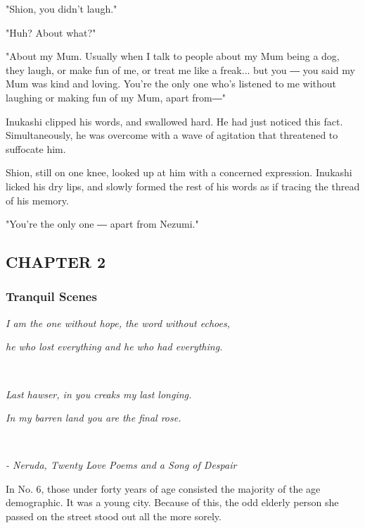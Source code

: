 "Shion, you didn't laugh."

"Huh? About what?"

"About my Mum. Usually when I talk to people about my Mum being a dog,
they laugh, or make fun of me, or treat me like a freak... but you ― you
said my Mum was kind and loving. You're the only one who's listened to
me without laughing or making fun of my Mum, apart from―"

Inukashi clipped his words, and swallowed hard. He had just noticed this
fact. Simultaneously, he was overcome with a wave of agitation that
threatened to suffocate him.

Shion, still on one knee, looked up at him with a concerned expression.
Inukashi licked his dry lips, and slowly formed the rest of his words as
if tracing the thread of his memory.

"You're the only one ― apart from Nezumi."

\hypertarget{index_split_001_split_000.htmlux5cux23calibre_pb_34}{}

\protect\hypertarget{index_split_034.html}{}{}

\hypertarget{index_split_034.htmlux5cux23calibre_pb_0}{}

\hypertarget{index_split_034.htmlux5cux23calibre_toc_3}{%
\subsection{CHAPTER 2}\label{index_split_034.htmlux5cux23calibre_toc_3}}

\subsubsection{Tranquil Scenes}

\emph{I am the one without hope, the word without echoes,}

\emph{he who lost everything and he who had everything.}

\emph{\\
}

\emph{Last hawser, in you creaks my last longing.}

\emph{In my barren land you are the final rose.}

\emph{\\
}

\emph{- Neruda, Twenty Love Poems and a Song of Despair}

In No. 6, those under forty years of age consisted the majority of the
age demographic. It was a young city. Because of this, the odd elderly
person she passed on the street stood out all the more sorely.

